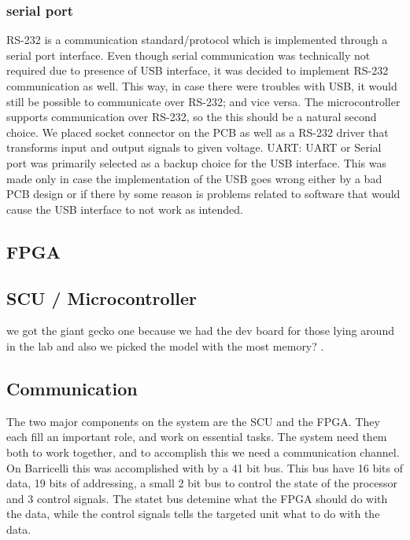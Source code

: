 
\subsubsection{serial port} 

RS-232 is a communication standard/protocol which is implemented through a serial port interface.
Even though serial communication was technically not required due to presence of USB interface, it was decided to implement RS-232 communication as well.
This way, in case there were troubles with USB, it would still be possible to communicate over RS-232; and vice versa.
The microcontroller supports communication over RS-232, so the this should be a natural second choice.
We placed socket connector on the PCB as well as a RS-232 driver that transforms input and output signals to given voltage.
UART: UART or Serial port was primarily selected as a backup choice for the USB interface. This was made only in case the implementation
of the USB goes wrong either by a bad PCB design or if there by some reason is problems related to software that would cause the USB interface to not work as intended.


\subsection{FPGA}


\subsection{SCU / Microcontroller}
we got the giant gecko one because we had the dev board for those lying around in the lab and also we picked the model with the most memory? .


\subsection{Communication} \label{pcb:design-choices:ss:internal_communication}

The two major components on the system are the SCU and the FPGA.
They each fill an important role, and work on essential tasks.
The system need them both to work together, and to accomplish this we need a communication channel.
On Barricelli this was accomplished with by a 41 bit bus.
This bus have 16 bits of data, 19 bits of addressing, a small 2 bit bus to control the state of the processor and 3 control signals.
The statet bus detemine what the FPGA should do with the data, while the control signals tells the targeted unit what to do with the data. 



